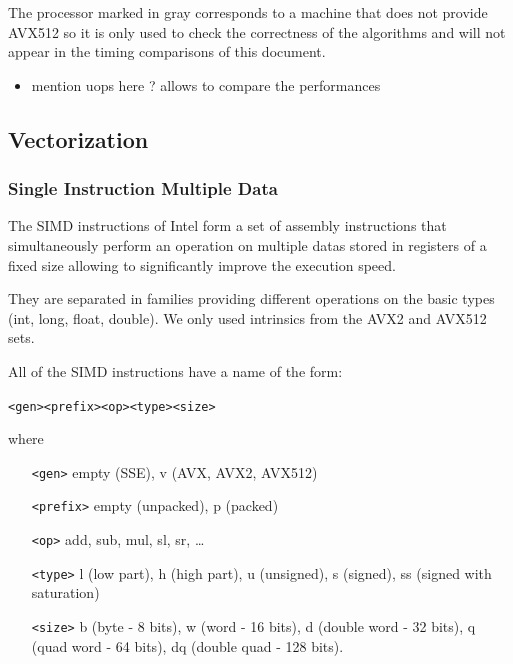 \documentclass[a4paper]{article}
\begin{document}
\bigskip
The processor marked in gray corresponds to a machine that does not provide AVX512 so it is only used to check the
correctness of the algorithms and will not appear in the timing comparisons of this document.

\begin{itemize}
    \item mention uops here ? allows to compare the performances 
\end{itemize}


\subsection{Vectorization}

\subsubsection{Single Instruction Multiple Data}

The SIMD instructions of Intel form a set of assembly instructions that simultaneously perform an operation on multiple datas stored in registers
of a fixed size allowing to significantly improve the execution speed.

They are separated in families providing different operations on the basic types (int, long, float, double). We only used intrinsics from
the AVX2 and AVX512 sets.

\bigskip
All of the SIMD instructions have a name of the form:
\begin{center} 
    \texttt{<gen><prefix><op><type><size>}
\end{center}

where
\begin{center}
    \begin{minipage}{12cm}
        \begin{itemize}
            \item[\texttt{<gen>}] empty (SSE), v (AVX, AVX2, AVX512)
            \item[\texttt{<prefix>}] empty (unpacked), p (packed)
            \item[\texttt{<op>}] add, sub, mul, sl, sr, \dots
            \item[\texttt{<type>}] l (low part), h (high part), u (unsigned), s (signed), ss (signed with saturation)
            \item[\texttt{<size>}] b (byte - 8 bits), w (word - 16 bits), d (double word - 32 bits), q (quad word - 64 bits), 
            dq (double quad - 128 bits).
        \end{itemize}
    \end{minipage}
\end{center}
\end{document}
